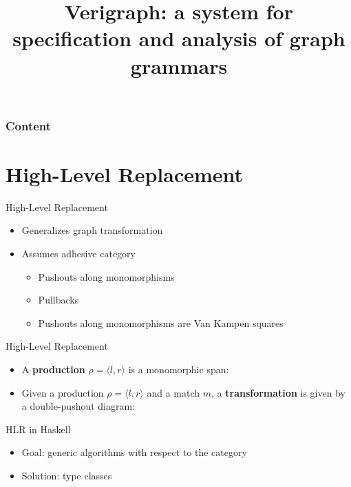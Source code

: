 \documentclass[xcolor=dvipsnames,pdf,11pt,handout]{beamer}
\title     {Verigraph: a system for specification and analysis of graph grammars}
\subtitle  {}
\author    {}
\institute {\inftitle}
\date      {}
\newcommand{\bi}{\begin{itemize}}
\newcommand{\ei}{\end{itemize}}
\newcommand{\tm}{\item}
\renewcommand{\contentstitle}{Outline}
\renewcommand{\contentstitle}{Content}
\begin{document}
\titlepageVerites

\begin{frame}
 \frametitle{\contentstitle}
 \tableofcontents
\end{frame}

\section{High-Level Replacement}

\begin{frame}[fragile]{High-Level Replacement}{}

\bi
\tm Generalizes graph transformation
\tm Assumes adhesive category
  \bi
  \tm Pushouts along monomorphisms
  \tm Pullbacks
  \tm Pushouts along monomorphisms are Van Kampen squares
  \ei
\ei

\end{frame}

\begin{frame}[fragile]{High-Level Replacement}{}

\bi
\tm A \textbf{production} $\rho = \langle l, r \rangle$ is a monomorphic span:
\centerline{
\vspace{.25cm}
}
\vspace{.75cm}

\tm Given a production $\rho = \langle l, r \rangle$ and a match $m$, a \textbf{transformation} is given by a double-pushout diagram:
\centerline{
\vspace{.25cm}
}

\ei

\end{frame}

\begin{frame}[fragile]{HLR in Haskell}{}

\bi
\tm Goal: generic algorithms with respect to the category
\tm Solution: type classes
\ei

\end{frame}
\end{document}
